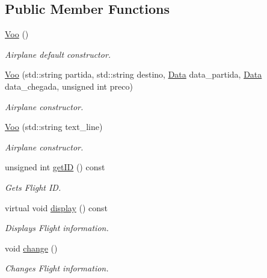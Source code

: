 \subsection*{Public Member Functions}
\begin{DoxyCompactItemize}
\item 
\mbox{\label{class_voo_a609426279fa49ee0dd2758a20e1346cb}} 
\hyperlink{class_voo_a609426279fa49ee0dd2758a20e1346cb}{Voo} ()
\begin{DoxyCompactList}\small\item\em Airplane default constructor. \end{DoxyCompactList}\item 
\hyperlink{class_voo_ad580355f03578e40a7ae4387c9ef350b}{Voo} (std\+::string partida, std\+::string destino, \hyperlink{class_data}{Data} data\+\_\+partida, \hyperlink{class_data}{Data} data\+\_\+chegada, unsigned int preco)
\begin{DoxyCompactList}\small\item\em Airplane constructor. \end{DoxyCompactList}\item 
\hyperlink{class_voo_af1b8c844bc10ff62f6e5a6fefd78b534}{Voo} (std\+::string text\+\_\+line)
\begin{DoxyCompactList}\small\item\em Airplane constructor. \end{DoxyCompactList}\item 
unsigned int \hyperlink{class_voo_af1d8170af6f6747d4010d2f16d6c64f1}{get\+ID} () const
\begin{DoxyCompactList}\small\item\em Gets Flight ID. \end{DoxyCompactList}\item 
\mbox{\label{class_voo_a0b078073d4def68b1ca0989766f08818}} 
virtual void \hyperlink{class_voo_a0b078073d4def68b1ca0989766f08818}{display} () const
\begin{DoxyCompactList}\small\item\em Displays Flight information. \end{DoxyCompactList}\item 
void \hyperlink{class_voo_afe83ba69fe20c5868a1c34eddf97a6f5}{change} ()
\begin{DoxyCompactList}\small\item\em Changes Flight information. \end{DoxyCompactList}\item 

\end{DoxyCompactItemize}
